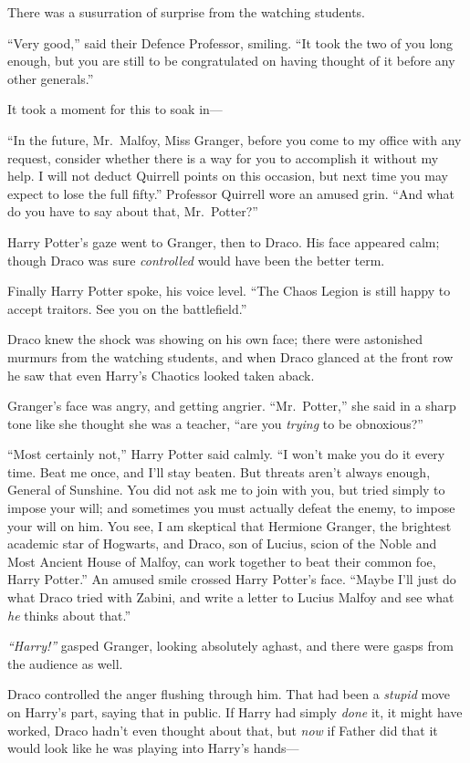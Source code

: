 There was a susurration of surprise from the watching students.

``Very good,'' said their Defence Professor, smiling. ``It took the two
of you long enough, but you are still to be congratulated on having
thought of it before any other generals.''

It took a moment for this to soak in---

``In the future, Mr.~Malfoy, Miss Granger, before you come to my office
with any request, consider whether there is a way for you to accomplish
it without my help. I will not deduct Quirrell points on this occasion,
but next time you may expect to lose the full fifty.'' Professor
Quirrell wore an amused grin. ``And what do you have to say about that,
Mr.~Potter?''

Harry Potter's gaze went to Granger, then to Draco. His face appeared
calm; though Draco was sure \emph{controlled} would have been the better
term.

Finally Harry Potter spoke, his voice level. ``The Chaos Legion is still
happy to accept traitors. See you on the battlefield.''

Draco knew the shock was showing on his own face; there were astonished
murmurs from the watching students, and when Draco glanced at the front
row he saw that even Harry's Chaotics looked taken aback.

Granger's face was angry, and getting angrier. ``Mr.~Potter,'' she said
in a sharp tone like she thought she was a teacher, ``are you
\emph{trying} to be obnoxious?''

``Most certainly not,'' Harry Potter said calmly. ``I won't make you do
it every time. Beat me once, and I'll stay beaten. But threats aren't
always enough, General of Sunshine. You did not ask me to join with you,
but tried simply to impose your will; and sometimes you must actually
defeat the enemy, to impose your will on him. You see, I am skeptical
that Hermione Granger, the brightest academic star of Hogwarts, and
Draco, son of Lucius, scion of the Noble and Most Ancient House of
Malfoy, can work together to beat their common foe, Harry Potter.'' An
amused smile crossed Harry Potter's face. ``Maybe I'll just do what
Draco tried with Zabini, and write a letter to Lucius Malfoy and see
what \emph{he} thinks about that.''

\emph{``Harry!''} gasped Granger, looking absolutely aghast, and there
were gasps from the audience as well.

Draco controlled the anger flushing through him. That had been a
\emph{stupid} move on Harry's part, saying that in public. If Harry had
simply \emph{done} it, it might have worked, Draco hadn't even thought
about that, but \emph{now} if Father did that it would look like he was
playing into Harry's hands---

